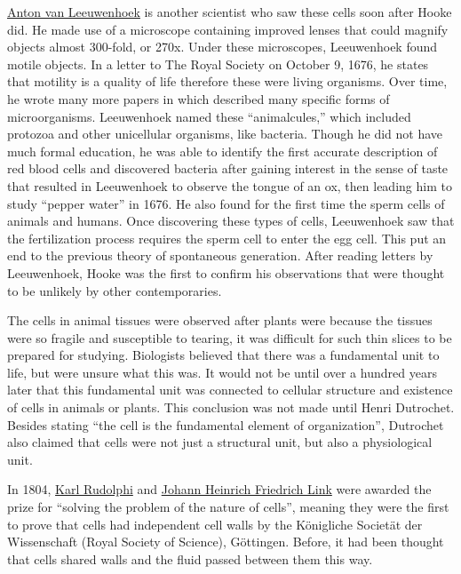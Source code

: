 \href{https://en.wikipedia.org/wiki/Antonie_van_Leeuwenhoek}{Anton van Leeuwenhoek} is another scientist who saw these cells soon after Hooke did. He made use of a microscope containing improved lenses that could magnify objects almost 300-fold, or 270x. Under these microscopes, Leeuwenhoek found motile objects. In a letter to The Royal Society on October 9, 1676, he states that motility is a quality of life therefore these were living organisms. Over time, he wrote many more papers in which described many specific forms of microorganisms. Leeuwenhoek named these ``animalcules,'' which included protozoa and other unicellular organisms, like bacteria. Though he did not have much formal education, he was able to identify the first accurate description of red blood cells and discovered bacteria after gaining interest in the sense of taste that resulted in Leeuwenhoek to observe the tongue of an ox, then leading him to study ``pepper water'' in 1676. He also found for the first time the sperm cells of animals and humans. Once discovering these types of cells, Leeuwenhoek saw that the fertilization process requires the sperm cell to enter the egg cell. This put an end to the previous theory of spontaneous generation. After reading letters by Leeuwenhoek, Hooke was the first to confirm his observations that were thought to be unlikely by other contemporaries.

The cells in animal tissues were observed after plants were because the tissues were so fragile and susceptible to tearing, it was difficult for such thin slices to be prepared for studying. Biologists believed that there was a fundamental unit to life, but were unsure what this was. It would not be until over a hundred years later that this fundamental unit was connected to cellular structure and existence of cells in animals or plants. This conclusion was not made until Henri Dutrochet. Besides stating ``the cell is the fundamental element of organization'', Dutrochet also claimed that cells were not just a structural unit, but also a physiological unit.

In 1804, \href{https://en.wikipedia.org/wiki/Karl_Rudolphi}{Karl Rudolphi} and \href{https://en.wikipedia.org/wiki/Johann_Heinrich_Friedrich_Link}{Johann Heinrich Friedrich Link} were awarded the prize for ``solving the problem of the nature of cells'', meaning they were the first to prove that cells had independent cell walls by the Königliche Societät der Wissenschaft (Royal Society of Science), Göttingen. Before, it had been thought that cells shared walls and the fluid passed between them this way.

